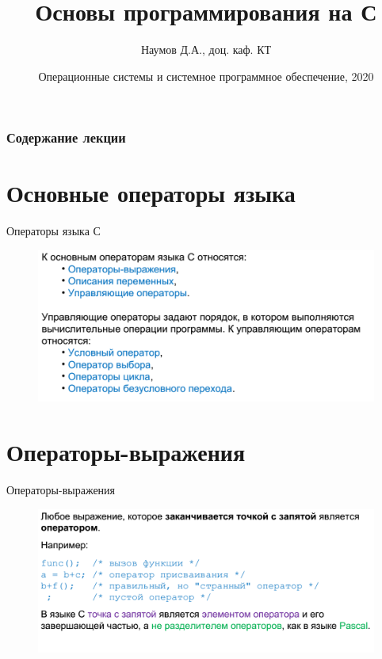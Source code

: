 \documentclass{beamer}
\title[Язык C]{Основы программирования на С}
\author{Наумов Д.А., доц. каф. КТ}
\date[10.09.2019] {Операционные системы и системное программное обеспечение, 2020}
\begin{document}
\begin{frame}
  \titlepage
\end{frame}
  
\begin{frame}
  \frametitle{Содержание лекции}
  \tableofcontents  
\end{frame}

\section{Основные операторы языка}

\begin{frame}{Операторы языка С}
\begin{figure}[h]
\centering
\includegraphics[scale=0.4]{images/lec02-pic01.png}
\end{figure}
\end{frame}

\section{Операторы-выражения}

\begin{frame}{Операторы-выражения}
\begin{figure}[h]
\centering
\includegraphics[scale=0.4]{images/lec02-pic02.png}
\end{figure}
\end{frame}
\end{document}
